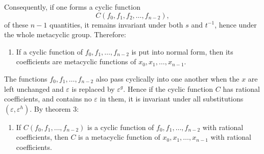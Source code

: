 \documentclass[11pt]{article}
\begin{document}
Consequently, if one forms a cyclic function
\begin{equation}\tag{7}
  C(f_0,f_1,f_2,\ldots,f_{n-2}),
\end{equation}
of these $n-1$ quantities, it remains invariant under both $s$ and $t^{-1}$, hence under the whole metacyclic group. Therefore:

\begin{enumerate}[resume,label=\arabic*.]
\item If a cyclic function of $f_0,f_1,\ldots,f_{n-2}$ is put into normal form, then its coefficients are metacyclic functions of $x_0,x_1,\ldots,x_{n-1}$.
\end{enumerate}

The functions $f_0,f_1,\ldots,f_{n-2}$ also pass cyclically into one another when the $x$ are left unchanged and $\varepsilon$ is replaced by $\varepsilon^g$. Hence if the cyclic function $C$ has rational coefficients, and contains no $\varepsilon$ in them, it is invariant under all substitutions $(\varepsilon,\varepsilon^h)$. By theorem 3:

\begin{enumerate}[resume,label=\arabic*.]
\item If $C(f_0,f_1,\ldots,f_{n-2})$ is a cyclic function of $f_0,f_1,\ldots,f_{n-2}$ with rational coefficients, then $C$ is a metacyclic function of $x_0,x_1,\ldots,x_{n-1}$ with rational coefficients.
\end{enumerate}
\end{document}
